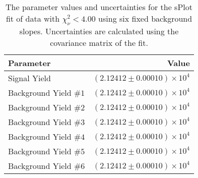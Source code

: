 
\begin{table}[ht]
    \begin{center}
        \begin{tabular}{lr}\toprule
            Parameter & Value \\\midrule
            Signal Yield & $(2.12412 \pm 0.00010) \times 10^{4}$ \\
            Background Yield $\#1$ & $(2.12412 \pm 0.00010) \times 10^{4}$ \\
            Background Yield $\#2$ & $(2.12412 \pm 0.00010) \times 10^{4}$ \\
            Background Yield $\#3$ & $(2.12412 \pm 0.00010) \times 10^{4}$ \\
            Background Yield $\#4$ & $(2.12412 \pm 0.00010) \times 10^{4}$ \\
            Background Yield $\#5$ & $(2.12412 \pm 0.00010) \times 10^{4}$ \\
            Background Yield $\#6$ & $(2.12412 \pm 0.00010) \times 10^{4}$ \\\bottomrule
        \end{tabular}
        \caption{The parameter values and uncertainties for the sPlot fit of data with $\chi^2_\nu < 4.00$ using six fixed background slopes. Uncertainties are calculated using the covariance matrix of the fit.}\label{tab:splot-fit-results-chisqdof-4.00-fixed-6}
    \end{center}
\end{table}
